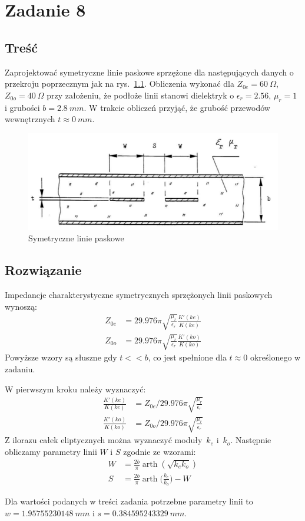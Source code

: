 \documentclass[rep.tex]{subfiles}
\begin{document}
\chapter{Zadanie 8}
\label{zad8}
\section{Treść}
Zaprojektować symetryczne linie paskowe sprzężone dla następujących danych o przekroju poprzecznym jak na rys.~\ref{fig:zad8:cstripline}.
Obliczenia wykonać dla $Z_{0e} = 60~\Omega$, $Z_{0o} = 40~\Omega$ przy założeniu,
że podłoże linii stanowi dielektryk o $\epsilon_r = 2.56$, $\mu_r = 1$ i grubości $b = 2.8~mm$.
W trakcie obliczeń przyjąć, że grubość przewodów wewnętrznych $t \approx 0~mm$.

\begin{figure}[!htbp]
  \centering
  \includegraphics[scale=0.5]{fig/zad8/cstripline}
  \caption{Symetryczne linie paskowe}
  \label{fig:zad8:cstripline}
\end{figure}

\section{Rozwiązanie}
Impedancje charakterystyczne symetrycznych sprzężonych linii paskowych wynoszą:
\begin{align}
  Z_{0e} &= 29.976 \pi \sqrt{\frac{\mu_r}{\epsilon_r}}\frac{K'(ke)}{K(ke)} \\
  Z_{0o} &= 29.976 \pi \sqrt{\frac{\mu_r}{\epsilon_r}}\frac{K'(ko)}{K(ko)}
\end{align}
Powyższe wzory są słuszne gdy $t << b$,
co jest spełnione dla $t \approx 0$ określonego w zadaniu.

W pierwszym kroku należy wyznaczyć:
\begin{align}
  \frac{K'(ke)}{K(ke)} &= Z_{0e} / 29.976 \pi \sqrt{\frac{\mu_r}{\epsilon_r}} \\
  \frac{K'(ko)}{K(ko)} &= Z_{0o} / 29.976 \pi \sqrt{\frac{\mu_r}{\epsilon_r}}
\end{align}
Z ilorazu całek eliptycznych można wyznaczyć moduły~$k_e$ i~$k_o$.
Następnie obliczamy parametry linii $W$ i $S$ zgodnie ze wzorami:
\begin{align}
  W &= \frac{2b}{\pi}\operatorname{arth}(\sqrt{k_ek_o}) \\
  S &= \frac{2b}{\pi}\operatorname{arth}\Big(\frac{k_e}{k_o}\Big) - W
\end{align}

Dla wartości podanych w treści zadania potrzebne parametry linii to $w = 1.95755230148~mm$ i $s = 0.384595243329~mm$. 
\end{document}

